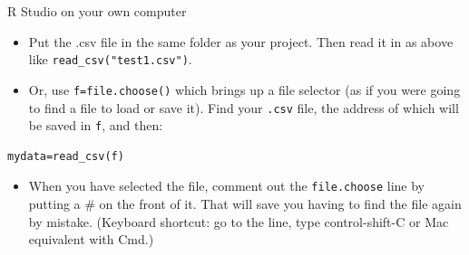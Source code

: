 \documentclass[ignorenonframetext,]{beamer}
\providecommand{\tightlist}{%
  \setlength{\itemsep}{0pt}\setlength{\parskip}{0pt}}
\begin{document}
\begin{frame}[fragile]{R Studio on your own computer}
\protect\hypertarget{r-studio-on-your-own-computer}{}

\begin{itemize}
\tightlist
\item
  Put the .csv file in the same folder as your project. Then read it in
  as above like \texttt{read\_csv("test1.csv")}.
\item
  Or, use \texttt{f=file.choose()} which brings up a file selector (as
  if you were going to find a file to load or save it). Find your
  \texttt{.csv} file, the address of which will be saved in \texttt{f},
  and then:
\end{itemize}

\begin{verbatim}
mydata=read_csv(f)
\end{verbatim}

\begin{itemize}
\tightlist
\item
  When you have selected the file, comment out the \texttt{file.choose}
  line by putting a \# on the front of it. That will save you having to
  find the file again by mistake. (Keyboard shortcut: go to the line,
  type control-shift-C or Mac equivalent with Cmd.)
\end{itemize}

\end{frame}
\end{document}
